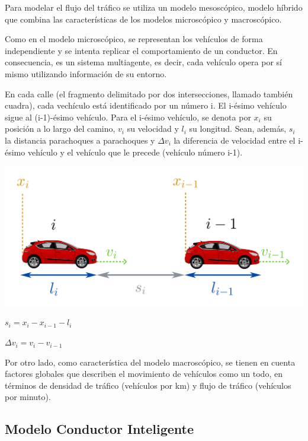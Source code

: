 \documentclass[colorinlistoftodos,twoside,twocolumn]{article} %
\begin{document}
	Para modelar el flujo del tráfico se utiliza un modelo mesosc\'opico, modelo híbrido que combina las características de los modelos microscópico y macroscópico.
	
	Como en el modelo microsc\'opico, se representan los vehículos de forma independiente y se intenta replicar el comportamiento de un conductor. En consecuencia, es un sistema multiagente, es decir, cada vehículo opera por sí mismo utilizando información de su entorno.
	
	En cada calle (el fragmento delimitado por dos intersecciones, llamado tambi\'en cuadra), cada vech\'iculo est\'a identificado por un número i. El i-ésimo vehículo sigue al (i-1)-ésimo vehículo. Para el i-ésimo vehículo, se denota por $ x_{i} $ su posición a lo largo del camino, $ v_{i} $ su velocidad y $ l_{i} $ su longitud. Sean, adem\'as, $ s_{i} $ la distancia parachoques a parachoques y $ \Delta v_{i} $ la diferencia de velocidad entre el i-ésimo vehículo y el vehículo que le precede (vehículo número i-1).
	
	\begin{center}
		\includegraphics[width=\columnwidth]{microscopic_model.png}
	\end{center}
	
	\begin{center}
		$ s_{i} = x_{i} - x_{i-1} - l_{i} $
	
		$ \Delta v_{i} = v_{i} - v_{i-1} $
	\end{center}
	
	Por otro lado, como caracter\'istica del modelo macrosc\'opico, se tienen en cuenta factores globales que describen el movimiento de vehículos como un todo, en términos de densidad de tráfico (vehículos por km) y flujo de tráfico (vehículos por minuto).
	
	
	\subsection{Modelo Conductor Inteligente}
	
\end{document}
